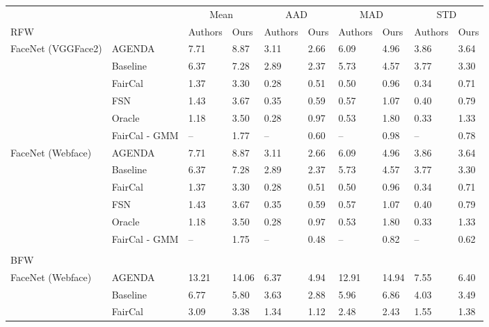 \begin{table}
\footnotesize
\centering
\begin{tabular}{l l ll ll ll ll}
\toprule
&& \multicolumn{2}{c}{Mean} & \multicolumn{2}{c}{AAD} & \multicolumn{2}{c}{MAD} & \multicolumn{2}{c}{STD} \\
RFW & &  Authors & Ours & Authors & Ours & Authors & Ours & Authors & Ours \\
\midrule
\multirow{5}{5em}{FaceNet (VGGFace2)} 
& AGENDA       &    7.71 &  8.87  &    3.11 &  2.66  &    6.09 &  4.96  &    3.86 &  3.64  \\
& Baseline     &    6.37 &  7.28  &    2.89 &  2.37  &    5.73 &  4.57  &    3.77 &  3.30  \\
& FairCal      &    1.37 &  3.30  &    0.28 &  0.51  &    0.50 &  0.96  &    0.34 &  0.71  \\
& FSN          &    1.43 &  3.67  &    0.35 &  0.59  &    0.57 &  1.07  &    0.40 &  0.79  \\
& Oracle       &    1.18 &  3.50  &    0.28 &  0.97  &    0.53 &  1.80  &    0.33 &  1.33  \\
& FairCal - GMM &     -- &  1.77  &     -- &  0.60  &     -- &  0.98  &     -- &  0.78  \\
\hline
\multirow{5}{5em}{FaceNet (Webface)} 
& AGENDA       &    7.71 &  8.87  &    3.11 &  2.66  &    6.09 &  4.96  &    3.86 &  3.64  \\
& Baseline     &    6.37 &  7.28  &    2.89 &  2.37  &    5.73 &  4.57  &    3.77 &  3.30  \\
& FairCal      &    1.37 &  3.30  &    0.28 &  0.51  &    0.50 &  0.96  &    0.34 &  0.71  \\
& FSN          &    1.43 &  3.67  &    0.35 &  0.59  &    0.57 &  1.07  &    0.40 &  0.79  \\
& Oracle       &    1.18 &  3.50  &    0.28 &  0.97  &    0.53 &  1.80  &    0.33 &  1.33  \\
& FairCal - GMM &     -- &  1.75  &     -- &  0.48  &     -- &  0.82  &     -- &  0.62  \\
\midrule
\\
BFW & & &  &  &  &  &  &  &  \\
\midrule
\multirow{5}{5em}{FaceNet (Webface)}
& AGENDA       &   13.21 &  14.06  &    6.37 &  4.94  &   12.91 &  14.94  &    7.55 &  6.40  \\
& Baseline     &    6.77 &   5.80  &    3.63 &  2.88  &    5.96 &   6.86  &    4.03 &  3.49  \\
& FairCal      &    3.09 &   3.38  &    1.34 &  1.12  &    2.48 &   2.43  &    1.55 &  1.38  \\

\end{tabular}
\end{table}
